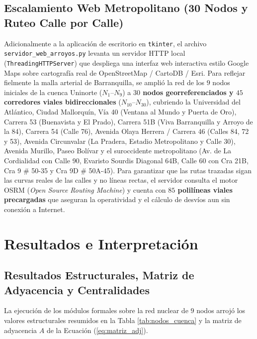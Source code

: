 \documentclass[12pt,letterpaper]{article}
\begin{document}
\subsection{Escalamiento Web Metropolitano (30 Nodos y Ruteo Calle por Calle)}

Adicionalmente a la aplicación de escritorio en \texttt{tkinter}, el archivo \texttt{servidor\_\allowbreak{}web\_\allowbreak{}arroyos.py} levanta un servidor HTTP local (\texttt{ThreadingHTTPServer}) que despliega una interfaz web interactiva estilo Google Maps sobre cartografía real de OpenStreetMap / CartoDB / Esri. Para reflejar fielmente la malla arterial de Barranquilla, se amplió la red de los $9$ nodos iniciales de la cuenca Uninorte ($N_1$--$N_9$) a \textbf{$30$ nodos georreferenciados y $45$ corredores viales bidireccionales} ($N_{10}$--$N_{30}$), cubriendo la Universidad del Atlántico, Ciudad Mallorquín, Vía 40 (Ventana al Mundo y Puerta de Oro), Carrera 53 (Buenavista y El Prado), Carrera 51B (Viva Barranquilla y Arroyo de la 84), Carrera 54 (Calle 76), Avenida Olaya Herrera / Carrera 46 (Calles 84, 72 y 53), Avenida Circunvalar (La Pradera, Estadio Metropolitano y Calle 30), Avenida Murillo, Paseo Bolívar y el suroccidente metropolitano (Av. de La Cordialidad con Calle 90, Evaristo Sourdis Diagonal 64B, Calle 60 con Cra 21B, Cra 9 \# 50-35 y Cra 9D \# 50A-45). Para garantizar que las rutas trazadas sigan las curvas reales de las calles y no líneas rectas, el servidor consulta el motor OSRM (\textit{Open Source Routing Machine}) y cuenta con \textbf{$85$ polilíneas viales precargadas} que aseguran la operatividad y el cálculo de desvíos aun sin conexión a Internet.

\section{Resultados e Interpretación}

\subsection{Resultados Estructurales, Matriz de Adyacencia y Centralidades}

La ejecución de los módulos formales sobre la red nuclear de $9$ nodos arrojó los valores estructurales resumidos en la Tabla \ref{tab:nodos_cuenca} y la matriz de adyacencia $A$ de la Ecuación (\ref{eq:matriz_adj}).
\end{document}
